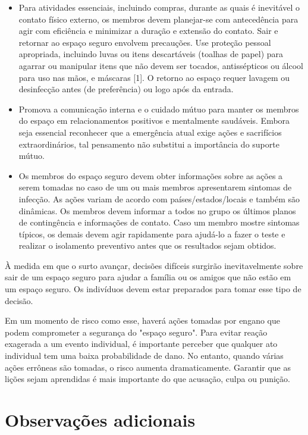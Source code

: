 \documentclass[onecolumn,journal]{IEEEtran}
\begin{document}
\begin{multicols}{2}
\begin{itemize}
\item Para atividades essenciais, incluindo compras, durante as quais é inevitável o contato físico externo, os membros devem planejar-se com antecedência para agir com eficiência e minimizar a duração e extensão do contato. Sair e retornar ao espaço seguro envolvem precauções. Use proteção pessoal apropriada, incluindo luvas ou itens descartáveis (toalhas de papel) para agarrar ou manipular itens que não devem ser tocados, antissépticos ou álcool para uso nas mãos, e máscaras [1]. O retorno ao espaço requer lavagem ou desinfecção antes (de preferência) ou logo após da entrada.

\item Promova a comunicação interna e o cuidado mútuo para manter os membros do espaço em relacionamentos positivos e mentalmente saudáveis. Embora seja essencial reconhecer que a emergência atual exige ações e sacrifícios extraordinários, tal pensamento não substitui a importância do suporte mútuo.
\item Os membros do espaço seguro devem obter informações sobre as ações a serem tomadas no caso de um ou mais membros apresentarem sintomas de infecção. As ações variam de acordo com países/estados/locais e também são dinâmicas. Os membros devem informar a todos no grupo os últimos planos de contingência e informações de contato. Caso um membro mostre sintomas típicos, os demais devem agir rapidamente para ajudá-lo a fazer o teste e realizar o isolamento preventivo antes que os resultados sejam obtidos.
\end{itemize}

À medida em que o surto avançar, decisões difíceis surgirão inevitavelmente sobre sair de um espaço seguro para ajudar a família ou os amigos que não estão em um espaço seguro. Os indivíduos devem estar preparados para tomar esse tipo de decisão.

Em um momento de risco como esse, haverá ações tomadas por engano que podem comprometer a segurança do "espaço seguro". Para evitar reação exagerada a um evento individual, é importante perceber que qualquer ato individual tem uma baixa probabilidade de dano. No entanto, quando várias ações errôneas são tomadas, o risco aumenta dramaticamente. Garantir que as lições sejam aprendidas é mais importante do que acusação, culpa ou punição.

\section*{Observações adicionais}


\end{multicols}
\end{document}
